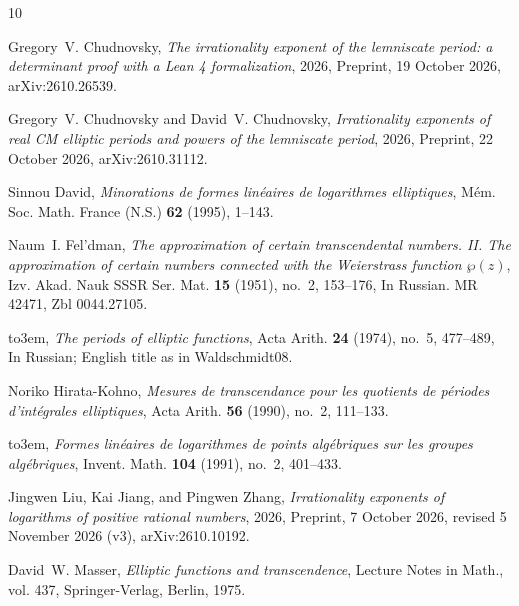\documentclass[11pt]{amsart}
\theoremstyle{definition}
\theoremstyle{remark}
\numberwithin{equation}{section}
\begin{document}
\providecommand{\bysame}{\leavevmode\hbox to3em{\hrulefill}\thinspace}
\providecommand{\MR}{\relax\ifhmode\unskip\space\fi MR }
\providecommand{\MRhref}[2]{%
  \href{http://www.ams.org/mathscinet-getitem?mr=#1}{#2}
}
\providecommand{\href}[2]{#2}
\begin{thebibliography}{10}

Gregory~V. Chudnovsky, \emph{The irrationality exponent of the lemniscate
  period: a determinant proof with a {L}ean 4 formalization}, 2026, Preprint,
  19 October 2026, \href{https://arxiv.org/abs/2610.26539}{arXiv:2610.26539}.

Gregory~V. Chudnovsky and David~V. Chudnovsky, \emph{Irrationality exponents of
  real {CM} elliptic periods and powers of the lemniscate period}, 2026,
  Preprint, 22 October 2026,
  \href{https://arxiv.org/abs/2610.31112}{arXiv:2610.31112}.

Sinnou David, \emph{Minorations de formes lin\'eaires de logarithmes
  elliptiques}, M\'em. Soc. Math. France (N.S.) \textbf{62} (1995), 1--143.

Naum~I. Fel'dman, \emph{The approximation of certain transcendental numbers.
  {II}. {T}he approximation of certain numbers connected with the {W}eierstrass
  function {$\wp(z)$}}, Izv. Akad. Nauk SSSR Ser. Mat. \textbf{15} (1951),
  no.~2, 153--176, In Russian. MR 42471, Zbl 0044.27105.

\bysame, \emph{The periods of elliptic functions}, Acta Arith. \textbf{24}
  (1974), no.~5, 477--489, In Russian; English title as in Waldschmidt08.

Noriko Hirata-Kohno, \emph{Mesures de transcendance pour les quotients de
  p\'eriodes d'int\'egrales elliptiques}, Acta Arith. \textbf{56} (1990),
  no.~2, 111--133.

\bysame, \emph{Formes lin\'eaires de logarithmes de points alg\'ebriques sur
  les groupes alg\'ebriques}, Invent. Math. \textbf{104} (1991), no.~2,
  401--433.

Jingwen Liu, Kai Jiang, and Pingwen Zhang, \emph{Irrationality exponents of
  logarithms of positive rational numbers}, 2026, Preprint, 7 October 2026,
  revised 5 November 2026 (v3),
  \href{https://arxiv.org/abs/2610.10192}{arXiv:2610.10192}.

David~W. Masser, \emph{Elliptic functions and transcendence}, Lecture Notes in
  Math., vol. 437, Springer-Verlag, Berlin, 1975.


\end{thebibliography}
\end{document}
